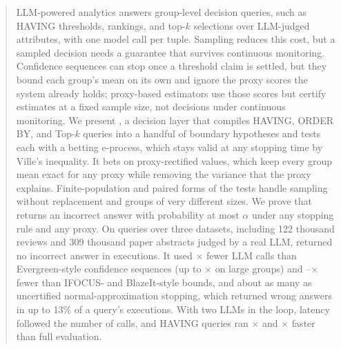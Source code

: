 \begin{abstract}
LLM-powered analytics answers group-level decision queries, such as HAVING thresholds, rankings, and top-$k$ selections over LLM-judged attributes, with one model call per tuple.
Sampling reduces this cost, but a sampled decision needs a guarantee that survives continuous monitoring.
Confidence sequences can stop once a threshold claim is settled, but they bound each group's mean on its own and ignore the proxy scores the system already holds; proxy-based estimators use those scores but certify estimates at a fixed sample size, not decisions under continuous monitoring.
We present \sys{}, a decision layer that compiles HAVING, ORDER BY, and Top-$k$ queries into a handful of boundary hypotheses and tests each with a betting e-process, which stays valid at any stopping time by Ville's inequality.
It bets on proxy-rectified values, which keep every group mean exact for any proxy while removing the variance that the proxy explains.
Finite-population and paired forms of the tests handle sampling without replacement and groups of very different sizes.
We prove that \sys{} returns an incorrect answer with probability at most $\alpha$ under any stopping rule and any proxy.
On \numNQ{} queries over three datasets, including 122 thousand reviews and 309 thousand paper abstracts judged by a real LLM, \sys{} returned no incorrect answer in \numNEXEC{} executions.
It used \numRWSR$\times$ fewer LLM calls than Evergreen-style confidence sequences (up to \numRWSRMAX$\times$ on large groups) and \numRHS--\numRBSP$\times$ fewer than IFOCUS- and BlazeIt-style bounds, and about as many as uncertified normal-approximation stopping, which returned wrong answers in up to 13\% of a query's executions.
With two LLMs in the loop, latency followed the number of calls, and HAVING queries ran \numLiveHavingMin$\times$ and \numLiveHavingMax$\times$ faster than full evaluation.
\end{abstract}
